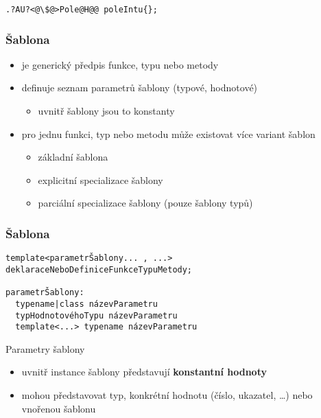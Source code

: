 \begin{frame}[fragile]
\begin{twocols}
\twocolssep

\begin{noteblock}{}
\begin{lstlisting}[basicstyle=\scriptsize]
.?AU?<@\$@>Pole@H@@ poleIntu{};
\end{lstlisting}
\end{noteblock}
\end{twocols}
\end{frame}













\begin{frame}[fragile]
\frametitle{Šablona}
\begin{block}{}
\begin{itemize}
\item je generický předpis funkce, typu nebo metody
\item definuje seznam parametrů šablony (typové, hodnotové)
\begin{itemize}
\item uvnitř šablony jsou to konstanty
\end{itemize}

\item pro jednu funkci, typ nebo metodu může existovat více variant šablon
\begin{itemize}
\item základní šablona
\item explicitní specializace šablony
\item parciální specializace šablony (pouze šablony typů)
\end{itemize}
\end{itemize}
\end{block}

\end{frame}




\begin{frame}[fragile]
\frametitle{Šablona}
\begin{noteblock}{}
\begin{lstlisting}
template<parametrŠablony... , ...>
deklaraceNeboDefiniceFunkceTypuMetody;

parametrŠablony:
  typename|class názevParametru
  typHodnotovéhoTypu názevParametru
  template<...> typename názevParametru
\end{lstlisting}
\end{noteblock}

\begin{block}{Parametry šablony}
\begin{itemize}
\item uvnitř instance šablony představují \textbf{konstantní hodnoty}
\item mohou představovat typ, konkrétní hodnotu (číslo, ukazatel, \ldots) nebo vnořenou šablonu
\end{itemize}
\end{block}
\end{frame}




